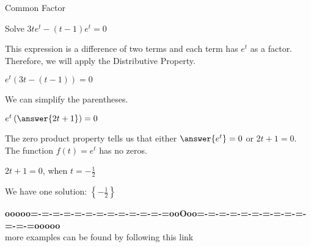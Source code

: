 \documentclass{ximera}
\begin{document}
\begin{example} Common Factor


Solve $3t e^t - (t-1) e^t = 0$

\begin{explanation}



This expression is a difference of two terms and each term has $e^t$ as a factor.  Therefore, we will apply the Distributive Property.



$e^t (3t - (t-1))= 0$


We can simplify the parentheses.



$e^t \left( \answer{2t + 1} \right)= 0$



The zero product property tells us that either $\answer{e^t} = 0$ or $2t + 1 = 0$.  \\

The function $f(t) = e^t$ has no zeros. 


$2t + 1 = 0$, when $t = -\frac{1}{2}$

We have one solution: $\left\{ -\frac{1}{2} \right\}$

\end{explanation}
\end{example}















\begin{center}
\textbf{\textcolor{green!50!black}{ooooo=-=-=-=-=-=-=-=-=-=-=-=-=ooOoo=-=-=-=-=-=-=-=-=-=-=-=-=ooooo}} \\

more examples can be found by following this link\\ 

\end{center}
\end{document}
